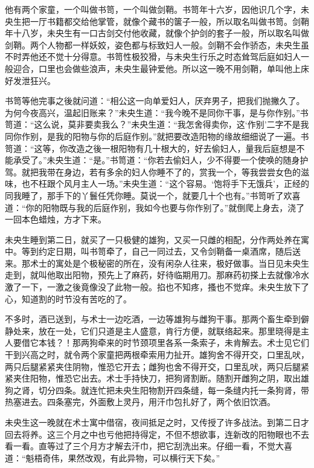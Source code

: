\documentclass[a4paper,12pt,UTF8,twoside]{ctexbook}
\begin{document}
他有两个家童，一个叫做书笥，一个叫做剑鞘。书笥年十六岁，因他识几个字，未央生把一厅书籍都交给他掌管，就像个藏书的箧子一般，所以取名叫做书笥。剑鞘年十八岁，未央生有一口古剑交付他收藏，就像个护剑的套子一般，所以取名叫做剑鞘。两个人物都一样妖姣，姿色都与标致妇人一般。剑鞘不会作骄态，未央生虽不时弄他还不觉十分得意。书笥性极狡猾，与未央生行乐之时态耸驾后庭如妇人一般迎合，口里也会做些浪声，未央生最钟爱他。所以这一晚不用剑鞘，单叫他上床好发泄狂兴。

书笥等他完事之後就问道：“相公这一向单爱妇人，厌弃男子，把我们抛撇久了。为何今夜高兴，温起旧账来？”未央生道：“我今晚不是同你干事，是与你作别。”书笥道：“这么说，莫非要卖我么？”未央生道：“我怎舍得卖你，这‘作别’二字不是我同你作别，是我的阳物与你的后庭作别。”就把要改造阳物的缘故细细说了一遍。书笥道：“这等，你改造之後一根阳物有几十根大的，好去偷妇人，量我后庭想是不能承受了。”未央生道：“是。”书笥道：“你若去偷妇人，少不得要一个使唤的随身护驾。就把我带在身边，若有多余的妇人你睡不了的，赏我一个，等我尝尝女色的滋味，也不枉跟个风月主人一场。”未央生道：“这个容易。‘饱将手下无饿兵’，正经的同我睡了，那手下的丫鬟任凭你睡。莫说一个，就要几十个也有。”书笥听了欢喜道：“你的阳物既与我的后庭作别，我如今也要与你作别了。”就倒爬上身去，浇了一回本色蜡烛，方才下来。

未央生睡到第二日，就买了一只极健的雄狗，又买一只雌的相配，分作两处养在寓中。等到约定日期，叫书笥牵了，自己一同过去，又令剑鞘备一桌酒席，随后送来。那术士的寓处是个极秘密的所在，没有闲杂人往来，极好做事。当日见未央生走到，就叫他取出阳物，预先上了麻药，好待临期用刀。那麻药初搽上去就像冷水激了一下，一激之後竟像没了此物一般。掐也不知疼，搔也不觉痒。未央生放下了心，知道割的时节没有苦吃的了。

不多时，酒已送到，与术士一边吃酒，一边等雄狗与雌狗干事。那两个畜生牵到僻静处来，放在一处，它们只道是主人盛意，肯行方便，就联络起来。那里晓得是主人要借它本钱？！那两狗牵来的时节颈项里各系一条索子，未肯解去。术士见它们干到兴高之时，就令两个家童把两根牵索用力扯开。雄狗舍不得开交，口里乱吠，两只后腿紧紧夹住阴物，惟恐它开去；雌狗也舍不得开交，口里乱吠，两只后腿紧紧夹住阳物，惟恐它出去。术士手持快刀，把狗肾割断。随割开雌狗之阴，取出雄狗之肾，切分四条。就连忙把未央生阳物割开四条缝，每一条缝内托一条狗肾，带热塞进去。四条塞完，外面敷上灵丹，用汗巾包扎好了，两个依旧饮酒。

未央生这一晚就在术士寓中借宿，夜间抵足之时，又传授了许多战法。到第二日才回去将养。这三个月之中也亏他把持得定，不但不想欲事，连新改的阳物眼也不去看一看。直等过了三个月方才解去汗巾，把它刮洗出来。仔细一看，不觉大喜道：“魁梧奇伟，果然改观，有此异物，可以横行天下矣。”
\end{document}
